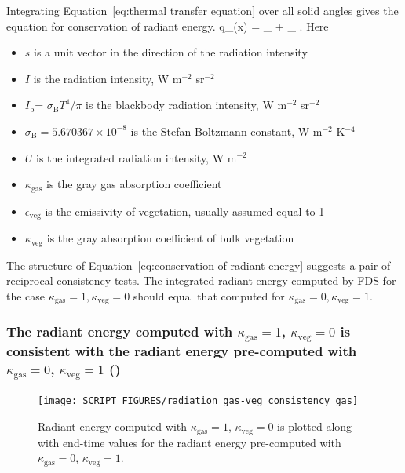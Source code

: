 \documentclass[11pt]{book}
\begin{document}
Integrating Equation~\ref{eq:thermal transfer equation} over all solid
angles gives the equation for conservation of radiant energy.
\be
\nabla \cdot q_{}(x) = \kappa_{}  +
\kappa_{} .
\label{eq:conservation of radiant energy}
\ee	
Here
\begin{itemize}
 \item $s$ is a unit vector in the direction of the radiation intensity
 \item $I$ is the radiation intensity, W m$^{-2}$ sr$^{-2}$
 \item $I_{\mathrm{b}}$= $\sigma_{\mathrm{B}} T^4/\pi$ is the blackbody radiation intensity, W m$^{-2}$ sr$^{-2}$
 \item $\sigma_{\mathrm{B}} = 5.670367 \times 10^{−8}$  is the
   Stefan-Boltzmann constant, W m$^{−2}$ K$^{−4}$
 \item $U$ is the integrated radiation intensity, W m$^{-2}$
 \item $\kappa_{\mathrm{gas}}$ is the gray gas absorption coefficient
 \item $\epsilon_{\mathrm{veg}}$ is the emissivity of vegetation, usually
   assumed equal to 1
 \item $\kappa_{\mathrm{veg}}$ is the gray absorption coefficient of bulk vegetation
\end{itemize}
The structure of Equation~\ref{eq:conservation of radiant energy}
suggests a pair of reciprocal consistency tests.  The integrated radiant energy
computed by FDS for the case $\kappa_{\mathrm{gas}} = 1, \kappa_{\mathrm{veg}} = 0$ should equal that computed for
$\kappa_{\mathrm{gas}} = 0, \kappa_{\mathrm{veg}} = 1$.

\subsubsection{The radiant energy computed with $\kappa_{\mathrm{gas}}
  = 1$, $\kappa_{\mathrm{veg}} = 0$ is consistent with
 the radiant energy pre-computed with $\kappa_{\mathrm{gas}} = 0$,
$\kappa_{\mathrm{veg}} = 1$ (\texorpdfstring{}{radiation\_gas-veg\_consistency\_gas})}
\label{radiation_gas-veg_consistency_gas}

\begin{figure}[ht]
\centering
\texttt{[image: SCRIPT\_FIGURES/radiation\_gas-veg\_consistency\_gas]}
\caption[
test case.]{Radiant energy computed with $\kappa_{\mathrm{gas}}
  = 1$, $\kappa_{\mathrm{veg}} = 0$ is plotted along with end-time values
  for the radiant energy pre-computed with  $\kappa_{\mathrm{gas}} = 0$,
$\kappa_{\mathrm{veg}} = 1$.}
\label{fig_radiation_gas-veg_consistency_gas}
\end{figure}
\end{document}
